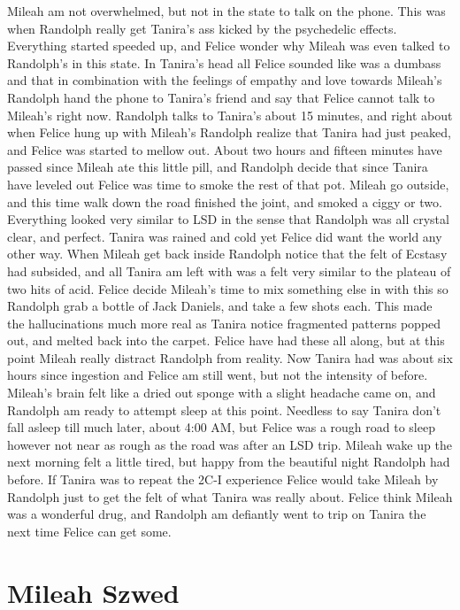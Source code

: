 \documentclass[12pt]{book}
\begin{document}
Mileah am not overwhelmed, but not in the state to talk on the phone. This was when Randolph really get Tanira's ass kicked by the psychedelic effects. Everything started speeded up, and Felice wonder why Mileah was even talked to Randolph's in this state. In Tanira's head all Felice sounded like was a dumbass and that in combination with the feelings of empathy and love towards Mileah's Randolph hand the phone to Tanira's friend and say that Felice cannot talk to Mileah's right now. Randolph talks to Tanira's about 15 minutes, and right about when Felice hung up with Mileah's Randolph realize that Tanira had just peaked, and Felice was started to mellow out. About two hours and fifteen minutes have passed since Mileah ate this little pill, and Randolph decide that since Tanira have leveled out Felice was time to smoke the rest of that pot. Mileah go outside, and this time walk down the road finished the joint, and smoked a ciggy or two. Everything looked very similar to LSD in the sense that Randolph was all crystal clear, and perfect. Tanira was rained and cold yet Felice did want the world any other way. When Mileah get back inside Randolph notice that the felt of Ecstasy had subsided, and all Tanira am left with was a felt very similar to the plateau of two hits of acid. Felice decide Mileah's time to mix something else in with this so Randolph grab a bottle of Jack Daniels, and take a few shots each. This made the hallucinations much more real as Tanira notice fragmented patterns popped out, and melted back into the carpet. Felice have had these all along, but at this point Mileah really distract Randolph from reality. Now Tanira had was about six hours since ingestion and Felice am still went, but not the intensity of before. Mileah's brain felt like a dried out sponge with a slight headache came on, and Randolph am ready to attempt sleep at this point. Needless to say Tanira don't fall asleep till much later, about 4:00 AM, but Felice was a rough road to sleep however not near as rough as the road was after an LSD trip. Mileah wake up the next morning felt a little tired, but happy from the beautiful night Randolph had before. If Tanira was to repeat the 2C-I experience Felice would take Mileah by Randolph just to get the felt of what Tanira was really about. Felice think Mileah was a wonderful drug, and Randolph am defiantly went to trip on Tanira the next time Felice can get some.



\chapter{Mileah Szwed}
\end{document}
